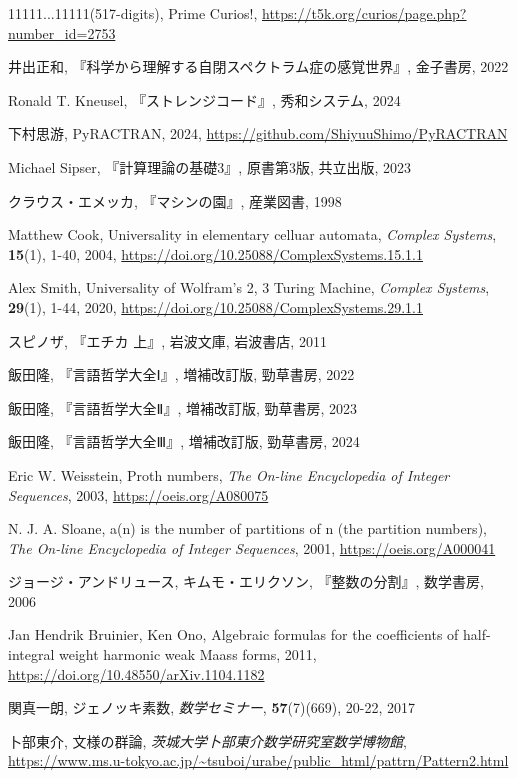 \documentclass[10pt, a5paper, twoside]{jsarticle}
\theoremstyle{definition}
\begin{document}
\begin{thebibliography}{99}
		 11111...11111(517-digits), Prime Curios!, \url{https://t5k.org/curios/page.php?number_id=2753}

		 井出正和, 『科学から理解する自閉スペクトラム症の感覚世界』, 金子書房, 2022

		 Ronald T. Kneusel, 『ストレンジコード』, 秀和システム, 2024

		 下村思游, PyRACTRAN, 2024, \url{https://github.com/ShiyuuShimo/PyRACTRAN}

		 Michael Sipser, 『計算理論の基礎3』, 原書第3版, 共立出版, 2023

		 クラウス・エメッカ, 『マシンの園』, 産業図書, 1998

		 Matthew Cook, Universality in elementary celluar automata, \textit{Complex Systems}, \textbf{15}(1), 1-40, 2004, \url{https://doi.org/10.25088/ComplexSystems.15.1.1}

		 Alex Smith, Universality of Wolfram's 2, 3 Turing Machine, \textit{Complex Systems}, \textbf{29}(1), 1-44, 2020, \url{https://doi.org/10.25088/ComplexSystems.29.1.1}

		 スピノザ, 『エチカ 上』, 岩波文庫, 岩波書店, 2011

		 飯田隆, 『言語哲学大全Ⅰ』, 増補改訂版, 勁草書房, 2022

		 飯田隆, 『言語哲学大全Ⅱ』, 増補改訂版, 勁草書房, 2023

		 飯田隆, 『言語哲学大全Ⅲ』, 増補改訂版, 勁草書房, 2024

		 Eric W. Weisstein, Proth numbers, \textit{The On-line Encyclopedia of Integer Sequences}, 2003, \url{https://oeis.org/A080075}

		 N. J. A. Sloane, a(n) is the number of partitions of n (the partition numbers), \textit{The On-line Encyclopedia of Integer Sequences}, 2001, \url{https://oeis.org/A000041}

		 ジョージ・アンドリュース, キムモ・エリクソン, 『整数の分割』, 数学書房, 2006
		
		 Jan Hendrik Bruinier, Ken Ono, Algebraic formulas for the coefficients of half-integral weight harmonic weak Maass forms, 2011, \url{https://doi.org/10.48550/arXiv.1104.1182}

		 関真一朗, ジェノッキ素数, \textit{数学セミナー}, \textbf{57}(7)(669), 20-22, 2017

		 卜部東介, 文様の群論, \textit{茨城大学卜部東介数学研究室数学博物館}, \url{https://www.ms.u-tokyo.ac.jp/~tsuboi/urabe/public_html/pattrn/Pattern2.html}


\end{thebibliography}
\end{document}

